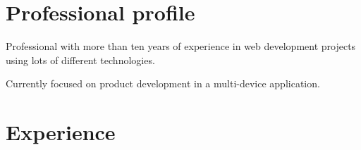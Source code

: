 \documentclass[letterpaper]{twentysecondcv} %
\begin{document}
\makeprofile %

\section{Professional profile}
Professional with more than ten years of experience in web development projects using lots of different technologies.

Currently focused on product development in a multi-device application.

\section{Experience}
\end{document}

